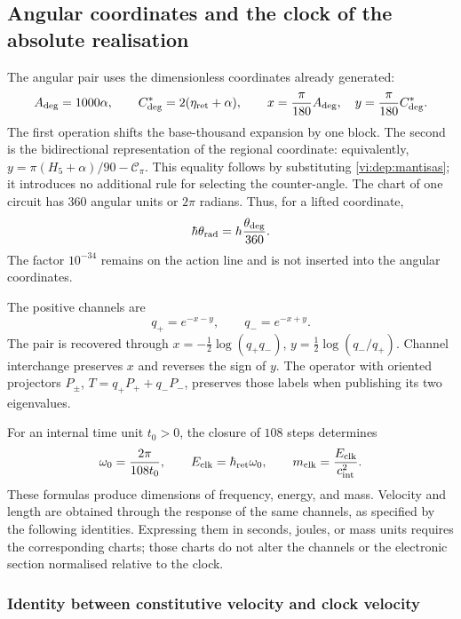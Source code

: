 \subsection{Angular coordinates and the clock of the absolute realisation}
\label{vi:dep:reloj}

The angular pair uses the dimensionless coordinates already generated:
\begin{equation}
 A_{\deg}=1000\alpha,\qquad
 C^*_{\deg}=2(\eta_{\rm ret}+\alpha),\qquad
 x=\frac{\pi}{180}A_{\deg},\quad
 y=\frac{\pi}{180}C^*_{\deg}.
 \label{vi:dep:angulos}
\end{equation}
The first operation shifts the base-thousand expansion by one block.
The second is the bidirectional representation of the regional coordinate:
equivalently,
\(y=\pi(H_5+\alpha)/90-\mathcal C_\pi\).
This equality follows by substituting \eqref{vi:dep:mantisas}; it
introduces no additional rule for selecting the counter-angle.
The chart of one circuit has \(360\) angular units or \(2\pi\)
radians. Thus, for a lifted coordinate,
\[
 \hbar\theta_{\rm rad}
 =h\frac{\theta_{\deg}}{360}.
\]
The factor \(10^{-34}\) remains on the action line and is not
inserted into the angular coordinates.

The positive channels are
\[
 q_+=e^{-x-y},\qquad q_-=e^{-x+y}.
\]
The pair is recovered through
\(x=-\tfrac12\log(q_+q_-)\),
\(y=\tfrac12\log(q_-/q_+)\). Channel interchange preserves
\(x\) and reverses the sign of \(y\). The operator with oriented
projectors \(P_\pm\),
\(T=q_+P_++q_-P_-\), preserves those labels when publishing its two
eigenvalues.

For an internal time unit \(t_0>0\), the closure of \(108\)
steps determines
\begin{equation}
 \omega_0=\frac{2\pi}{108t_0},\qquad
 E_{\rm clk}=\hbar_{\rm ret}\omega_0,
 \qquad m_{\rm clk}=\frac{E_{\rm clk}}{c_{\rm int}^{2}}.
 \label{vi:dep:reloj-absoluto}
\end{equation}
These formulas produce dimensions of frequency, energy, and mass.
Velocity and length are obtained through the response of the
same channels, as specified by the following identities. Expressing them
in seconds, joules, or mass units requires the corresponding
charts; those charts do not alter the channels or the electronic
section normalised relative to the clock.

\subsubsection{Identity between constitutive velocity and clock velocity}

